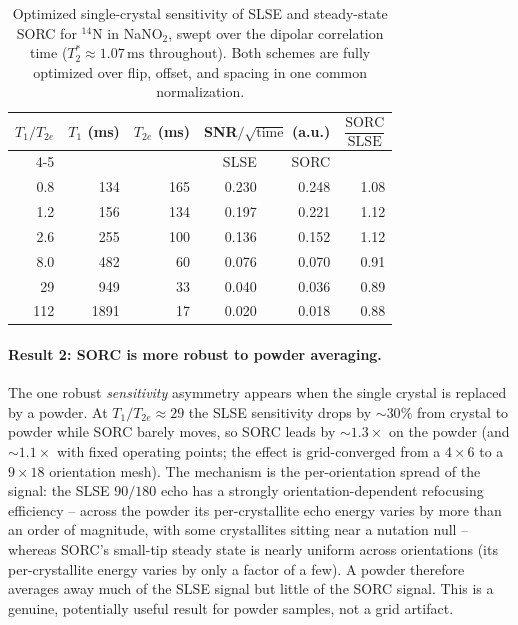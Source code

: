 \documentclass[11pt,oneside]{report}
\begin{document}
\begin{table}[h]
\centering
\begin{tabular}{rrrrrr}
\toprule
\(T_1/T_{2e}\) & \(T_1\) (ms) & \(T_{2e}\) (ms) & \multicolumn{2}{c}{SNR\(/\sqrt{\text{time}}\) (a.u.)} & \(\dfrac{\text{SORC}}{\text{SLSE}}\) \\
\cmidrule(lr){4-5}
& & & SLSE & SORC & \\
\midrule
0.8   & 134  & 165  & 0.230 & 0.248 & 1.08 \\
1.2   & 156  & 134  & 0.197 & 0.221 & 1.12 \\
2.6   & 255  & 100  & 0.136 & 0.152 & 1.12 \\
8.0   & 482  & 60   & 0.076 & 0.070 & 0.91 \\
29    & 949  & 33   & 0.040 & 0.036 & 0.89 \\
112   & 1891 & 17   & 0.020 & 0.018 & 0.88 \\
\bottomrule
\end{tabular}
\caption{Optimized single-crystal sensitivity of SLSE and steady-state SORC for
\({}^{14}\mathrm{N}\) in NaNO\(_2\), swept over the dipolar correlation time
(\(T_2^\ast \approx 1.07\,\mathrm{ms}\) throughout). Both schemes are fully
optimized over flip, offset, and spacing in one common normalization.}
\label{tab:slse-sorc}
\end{table}

\paragraph{Result 2: SORC is more robust to powder averaging.}
The one robust \emph{sensitivity} asymmetry appears when the single crystal is
replaced by a powder. At \(T_1/T_{2e}\approx 29\) the SLSE sensitivity drops by
\(\sim 30\%\) from crystal to powder while SORC barely moves, so SORC leads by
\(\sim 1.3\times\) on the powder (and \(\sim 1.1\times\) with fixed operating
points; the effect is grid-converged from a \(4\times 6\) to a \(9\times 18\)
orientation mesh). The mechanism is the per-orientation spread of the signal: the
SLSE \(90/180\) echo has a strongly orientation-dependent refocusing efficiency --
across the powder its per-crystallite echo energy varies by more than an order of
magnitude, with some crystallites sitting near a nutation null -- whereas SORC's
small-tip steady state is nearly uniform across orientations (its per-crystallite
energy varies by only a factor of a few). A powder therefore averages away much of
the SLSE signal but little of the SORC signal. This is a genuine, potentially
useful result for powder samples, not a grid artifact.
\end{document}
